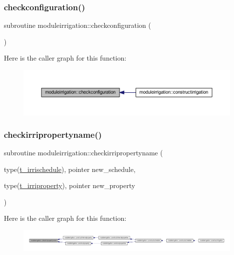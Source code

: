 \subsubsection{\texorpdfstring{checkconfiguration()}{checkconfiguration()}}
{\footnotesize\ttfamily subroutine moduleirrigation\+::checkconfiguration (\begin{DoxyParamCaption}{ }\end{DoxyParamCaption})\hspace{0.3cm}{\ttfamily [private]}}

Here is the caller graph for this function\+:\nopagebreak
\begin{figure}[H]
\begin{center}
\leavevmode
\includegraphics[width=350pt]{namespacemoduleirrigation_aa85b5fec6716d256db1e856f29f36468_icgraph}
\end{center}
\end{figure}
\mbox{\label{namespacemoduleirrigation_a13b8da4174e7efc86d8f045b78cd51fe}} 
\subsubsection{\texorpdfstring{checkirripropertyname()}{checkirripropertyname()}}
{\footnotesize\ttfamily subroutine moduleirrigation\+::checkirripropertyname (\begin{DoxyParamCaption}\item[{type(\mbox{\hyperlink{structmoduleirrigation_1_1t__irrischedule}{t\+\_\+irrischedule}}), pointer}]{new\+\_\+schedule,  }\item[{type(\mbox{\hyperlink{structmoduleirrigation_1_1t__irriproperty}{t\+\_\+irriproperty}}), pointer}]{new\+\_\+property }\end{DoxyParamCaption})\hspace{0.3cm}{\ttfamily [private]}}

Here is the caller graph for this function\+:\nopagebreak
\begin{figure}[H]
\begin{center}
\leavevmode
\includegraphics[width=350pt]{namespacemoduleirrigation_a13b8da4174e7efc86d8f045b78cd51fe_icgraph}
\end{center}
\end{figure}
\mbox{\label{namespacemoduleirrigation_a8b1ff94a2633495022dd8e0f95fd56a6}} 
